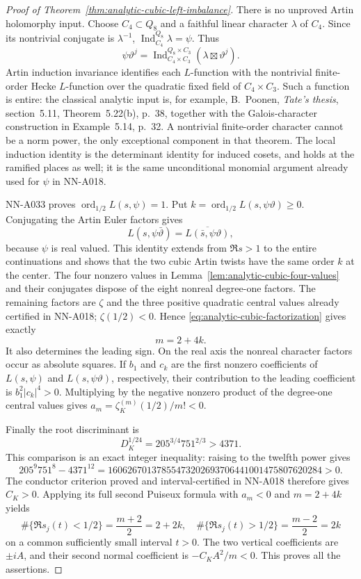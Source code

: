 \begin{proof}[Proof of Theorem~\ref{thm:analytic-cubic-left-imbalance}]
There is no unproved Artin holomorphy input. Choose $C_4\subset
Q_8$ and a faithful linear character $\lambda$ of $C_4$.
Since its nontrivial conjugate is $\lambda^{-1}$,
$\operatorname{Ind}_{C_4}^{Q_8}\lambda=\psi$. Thus
\[
 \psi\vartheta^j=
 \operatorname{Ind}_{C_4\times C_3}^{Q_8\times C_3}
                       (\lambda\boxtimes\vartheta^j).
\]
Artin induction invariance identifies each $L$-function with
the nontrivial finite-order Hecke $L$-function over the
quadratic fixed field of $C_4\times C_3$. Such a function is
entire: the classical analytic input is, for example,
B.~Poonen, \emph{Tate's thesis}, section~5.11,
Theorem~5.22(b), p.~38, together with the Galois-character
construction in Example~5.14, p.~32. A nontrivial finite-order
character cannot be a norm power, the only exceptional
component in that theorem. The local induction identity is
the determinant identity for induced cosets, and holds at the
ramified places as well; it is the same unconditional
monomial argument already used for $\psi$ in NN-A018.

NN-A033 proves
$\operatorname{ord}_{1/2}L(s,\psi)=1$. Put
$k=\operatorname{ord}_{1/2}L(s,\psi\vartheta)\ge0$.
Conjugating the Artin Euler factors gives
\[
 L(s,\psi\bar\vartheta)
       =\overline{L(\bar s,\psi\vartheta)},
\]
because $\psi$ is real valued. This identity extends from
$\Re s>1$ to the entire continuations and shows that the
two cubic Artin twists have the same order $k$ at the center.
The four nonzero values in Lemma~\ref{lem:analytic-cubic-four-values}
and their conjugates dispose of the eight nonreal
degree-one factors. The remaining factors are $\zeta$ and
the three positive quadratic central values already certified
in NN-A018; $\zeta(1/2)<0$. Hence
\eqref{eq:analytic-cubic-factorization} gives exactly
\[
                  m=2+4k.
\]
It also determines the leading sign. On the real axis the
nonreal character factors occur as absolute squares. If
$b_1$ and $c_k$ are the first nonzero coefficients of
$L(s,\psi)$ and $L(s,\psi\vartheta)$, respectively, their
contribution to the leading coefficient is
$b_1^2|c_k|^4>0$. Multiplying by the negative nonzero product
of the degree-one central values gives
$a_m=\zeta_K^{(m)}(1/2)/m!<0$.

Finally the root discriminant is
\[
 D_K^{1/24}=205^{3/4}751^{2/3}>4371.
\]
This comparison is an exact integer inequality: raising to
the twelfth power gives
\[
 205^9 751^8-4371^{12}
    =16062670137855473202693706441001475807620284>0.
\]
The conductor criterion proved and interval-certified in
NN-A018 therefore gives $C_K>0$. Applying its full second
Puiseux formula with $a_m<0$ and $m=2+4k$ yields
\[
 \#\{\Re s_j(t)<1/2\}=\frac{m+2}2=2+2k,
 \quad
 \#\{\Re s_j(t)>1/2\}=\frac{m-2}2=2k
\]
on a common sufficiently small interval $t>0$. The two
vertical coefficients are $\pm iA$, and their second normal
coefficient is $-C_KA^2/m<0$. This proves all the assertions.
\end{proof}

